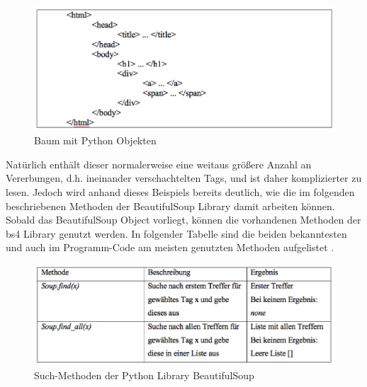 \documentclass[a4paper,oneside,12pt]{report}
\begin{document}
			\begin{figure}[H]
				\centering
				\begin{minipage}[b]{0.9\textwidth}
					\includegraphics[width=\textwidth]{Bilder/HTMLcode.png}
				\end{minipage}
				\centering
				\caption[HTML Code bs4]{Baum mit Python Objekten \cite{bib-webpython}}
				\label{pic-HTMLcode}
			\end{figure}
			
			Natürlich enthält dieser normalerweise eine weitaus größere Anzahl an Vererbungen, d.h. ineinander verschachtelten Tags, und ist daher komplizierter zu lesen. Jedoch wird anhand dieses Beispiels bereits deutlich, wie die im folgenden beschriebenen Methoden der BeautifulSoup Library damit arbeiten können.
			\newline
			Sobald das BeautifulSoup Object vorliegt, können die vorhandenen Methoden der bs4 Library genutzt werden. In folgender Tabelle sind die beiden bekanntesten und auch im Programm-Code am meisten genutzten Methoden aufgelistet \cite{bib-bs4}.
		
			\begin{figure}[H]
				\centering
				\begin{minipage}[b]{0.9\textwidth}
					\includegraphics[width=\textwidth]{Bilder/SoupMethoden.png}
				\end{minipage}
				\centering
				\caption[Methoden bs4]{Such-Methoden der Python Library BeautifulSoup \cite{bib-bs4}}
				\label{pic-SoupMethoden}
			\end{figure}
			
\end{document}
